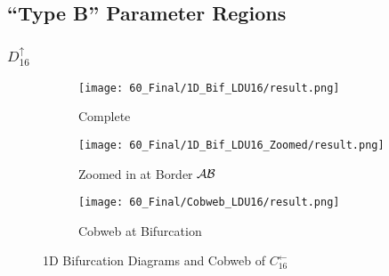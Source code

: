 \subsection{``Type B'' Parameter Regions}

\subsubsection{$D_{16}^\uparrow$}

\begin{figure}
    \centering
    \begin{subfigure}{0.3\textwidth}
        \centering
        \texttt{[image: 60\_Final/1D\_Bif\_LDU16/result.png]}
        \caption{Complete}
        \label{fig:final.bifurcation.D.up}
    \end{subfigure}
    \begin{subfigure}{0.3\textwidth}
        \centering
        \texttt{[image: 60\_Final/1D\_Bif\_LDU16\_Zoomed/result.png]}
        \caption{Zoomed in at Border $\mathcal{A}\mathcal{B}$}
        \label{fig:final.bifurcation.D.up.zoomed}
    \end{subfigure}
    \begin{subfigure}{0.3\textwidth}
        \centering
        \texttt{[image: 60\_Final/Cobweb\_LDU16/result.png]}
        \caption{Cobweb at Bifurcation}
        \label{fig:final.bifurcation.D.up.cobweb}
    \end{subfigure}
    \caption{1D Bifurcation Diagrams and Cobweb of $C_{16}^\leftarrow$}
\end{figure}
